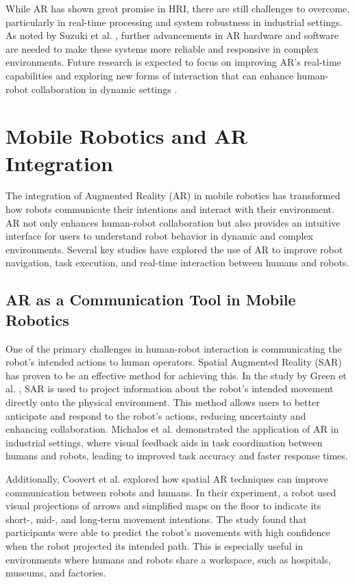 While AR has shown great promise in HRI, there are still challenges to overcome, particularly in real-time processing and system robustness in industrial settings. As noted by Suzuki et al. \cite{Suzuki2022}, further advancements in AR hardware and software are needed to make these systems more reliable and responsive in complex environments. Future research is expected to focus on improving AR’s real-time capabilities and exploring new forms of interaction that can enhance human-robot collaboration in dynamic settings \cite{Hentout2019}.


\section{Mobile Robotics and AR Integration}

The integration of Augmented Reality (AR) in mobile robotics has transformed how robots communicate their intentions and interact with their environment. AR not only enhances human-robot collaboration but also provides an intuitive interface for users to understand robot behavior in dynamic and complex environments. Several key studies have explored the use of AR to improve robot navigation, task execution, and real-time interaction between humans and robots.

\subsection{AR as a Communication Tool in Mobile Robotics}

One of the primary challenges in human-robot interaction is communicating the robot’s intended actions to human operators. Spatial Augmented Reality (SAR) has proven to be an effective method for achieving this. In the study by Green et al. \cite{Green2019}, SAR is used to project information about the robot’s intended movement directly onto the physical environment. This method allows users to better anticipate and respond to the robot’s actions, reducing uncertainty and enhancing collaboration. Michalos et al. \cite{Michalos2022} demonstrated the application of AR in industrial settings, where visual feedback aids in task coordination between humans and robots, leading to improved task accuracy and faster response times.

Additionally, Coovert et al. \cite{Coovert2014} explored how spatial AR techniques can improve communication between robots and humans. In their experiment, a robot used visual projections of arrows and simplified maps on the floor to indicate its short-, mid-, and long-term movement intentions. The study found that participants were able to predict the robot’s movements with high confidence when the robot projected its intended path. This is especially useful in environments where humans and robots share a workspace, such as hospitals, museums, and factories.

